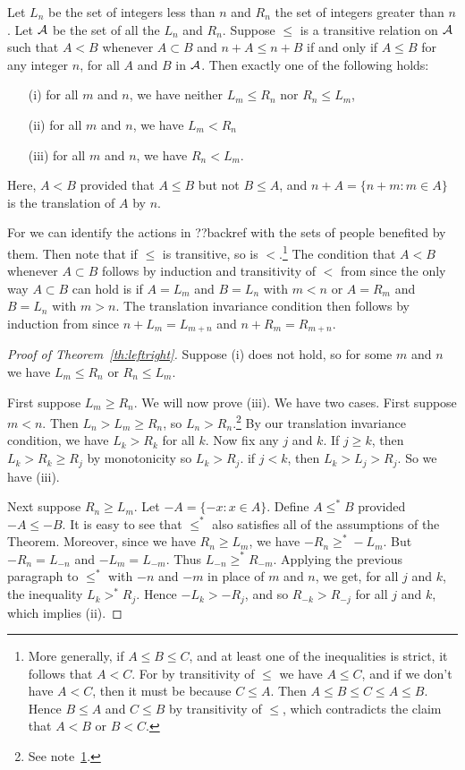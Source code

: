 \begin{theorem}\label{th:leftright} Let $L_n$ be the set of integers less than $n$
and $R_n$ the set of integers greater than $n$. Let $\mathcal A$ be the set of all
the $L_n$ and $R_n$. Suppose $\le$ is a transitive relation on $\mathcal A$ such that 
$A<B$ whenever $A\subset B$ and $n+A\le n+B$ if and only if $A\le B$ for any integer
$n$, for all $A$ and $B$ in $\mathcal A$. Then exactly one of the following holds:
\begin{itemize}
\item[{(i)}] for all $m$ and $n$, we have neither $L_m\le R_n$ nor $R_n\le L_m$,
\item[{(ii)}] for all $m$ and $n$, we have $L_m<R_n$
\item[{(iii)}] for all $m$ and $n$, we have $R_n<L_m$.
\end{itemize}
\end{theorem}
Here, $A<B$ provided that $A\le B$ but not $B\le A$, and $n+A=\{n+m:m\in A\}$ is the 
translation of $A$ by $n$.

For we can identify the actions in ??backref with the sets of people benefited by them.
Then note that if $\le$ is transitive, so is $<$.\footnote{\label{fn:trans}More generally, if $A\le B\le C$, and 
at least  one of the inequalities is strict, it follows that $A<C$. For by transitivity of 
$\le$ we have $A\le C$, and if we don't have $A<C$, then it must be because $C\le A$. Then
$A\le B\le C\le A\le B$. Hence $B\le A$ and $C\le B$ by transitivity of $\le$, which contradicts
the claim that $A<B$ or $B<C$.}
The condition that $A<B$ whenever $A\subset B$ follows by induction and transitivity of $<$ 
from  since the only way
$A\subset B$ can hold is if $A=L_m$ and $B=L_n$ with $m<n$ or $A=R_m$ and $B=L_n$ with $m>n$.
The translation invariance condition then follows by induction from  since $n+L_m=L_{m+n}$
and $n+R_m=R_{m+n}$.

\begin{proof}[Proof of Theorem~\ref{th:leftright}]
Suppose (i) does not hold, so for some $m$ and $n$ we have $L_m\le R_n$ or $R_n\le L_m$.

First suppose $L_m\ge R_n$. We will now prove (iii). 
We have two cases. First suppose $m<n$. Then 
$L_n>L_m\ge R_n$, so $L_n>R_n$.\footnote{See note~\ref{fn:trans}.}
By our translation invariance condition, we have $L_k>R_k$ for all $k$.
Now fix any $j$ and $k$. If $j\ge k$, then 
$L_k>R_k\ge R_j$ by monotonicity so $L_k>R_j$. if 
$j<k$, then $L_k>L_j>R_j$. So we have (iii).

Next suppose $R_n\ge L_m$. Let $-A = \{ -x : x \in A \}$.
Define $A \le^* B$ provided $-A \le -B$. It is easy 
to see that $\le^*$ also satisfies all of the 
assumptions of the Theorem. Moreover, since we have
$R_n\ge L_m$, we have $-R_n\ge^* -L_m$. But 
$-R_n = L_{-n}$ and $-L_m=L_{-m}$. Thus $L_{-n}\ge^* R_{-m}$.
Applying the previous paragraph to $\le^*$ with 
$-n$ and $-m$ in place of $m$ and $n$, we get, for 
all $j$ and $k$, the inequality $L_k>^*R_j$.
Hence $-L_k>-R_j$, and so $R_{-k}>R_{-j}$ for all
$j$ and $k$, which implies (ii).
\end{proof}

\chaptertail

